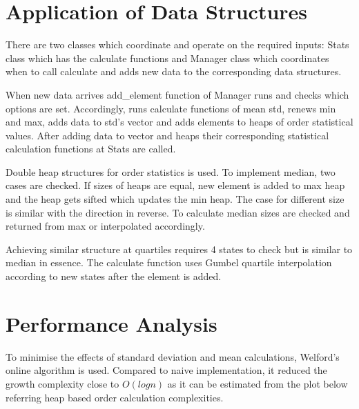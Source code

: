 \documentclass[a4paper, 12pt, titlepage]{article}
\begin{document}
\section{Application of Data Structures}
There are two classes which coordinate and operate on the required inputs: Stats class which has the calculate functions and Manager class which coordinates when to call calculate and adds new data to the corresponding data structures.
\par
When new data arrives add\_element function of Manager runs and checks which options are set. Accordingly, runs calculate functions of mean std, renews min and max, adds data to std's vector and adds elements to heaps of order statistical values. After adding data to vector and heaps their corresponding statistical calculation functions at Stats are called.
\par
Double heap structures for order statistics is used. To implement median, two cases are checked. If sizes of heaps are equal, new element is added to max heap and the heap gets sifted which updates the min heap. The case for different size is similar with the direction in reverse. To calculate median sizes are checked and returned from max or interpolated accordingly.
\par
Achieving similar structure at quartiles requires 4 states to check but is similar to median in essence. The calculate function uses Gumbel quartile interpolation according to new states after the element is added.

\section{Performance Analysis}
To minimise the effects of standard deviation and mean calculations, Welford's online algorithm is used. Compared to naive implementation, it reduced the growth complexity close to  \(O(logn)\) as it can be estimated from the plot below referring heap based order calculation complexities. 
\end{document}
